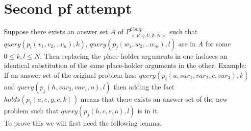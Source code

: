 \documentclass{article}
\begin{document}
\section{Second pf attempt}
Suppose there exists an answer set $A$ of $P_{<R,q,U,\emptyset,N>}^{Comp}$ such that $query(p_{i}(v_{1},v_{2},..v_{n}),k)$, $query(p_{j}(w_{1},w_{2},..w_{m}),l)$ are in $A$ for some $0\leq k, l \leq N$. Then replacing the place-holder arguments in one induces an identical substitution of the same place-holder arguments in the other. Example:\\
\newline
If an answer set of the original problem has:
$query(p_{i}(a,var_{1},var_{2},c,var_{3}),k)$ and $query(p_{j}(h,var_{3},var_{1},o),l)$ then adding the fact $holds(p_{i}(a,e,y,c,k))$ means that there exists an answer set of the new problem such that $query(p_{j}(h,c,e,o),l)$ is in it. \\
\newline
To prove this we will first need the following lemma.
\end{document}
